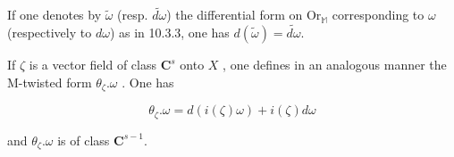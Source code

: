 If one denotes by \(\tilde{\omega}\) (resp. \(\widetilde{d\omega}\)) the differential form on \(\mathrm{Or}_{\mathbb{M}}\) corresponding to \(\omega\) (respectively to \(d\omega\)) as in 10.3.3, one has \(d(\tilde{\omega}) = \widetilde{d\omega}\).

If \(\zeta\) is a vector field of class \(\mathbf{C}^s\) onto \(X\) , one defines in an analogous manner the M-twisted form \(\theta_{\zeta}.\omega\) . One has

\[
\theta_ {\zeta}. \omega = d (i (\zeta) \omega) + i (\zeta) d \omega
\]

and \(\theta_{\zeta}.\omega\) is of class \(\mathbf{C}^{s - 1}\).

